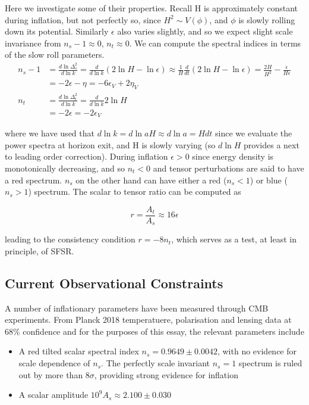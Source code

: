 \documentclass[a4paper,10pt]{article}
\begin{document}
Here we investigate some of their properties. Recall H is approximately constant during inflation, but not perfectly so, since $H^2 \sim V(\phi)$, and $\phi$ is slowly rolling down its potential. Similarly $\epsilon$ also varies slightly, and so we expect slight scale invariance from $n_s-1\approx0$, $n_t\approx0$. We can compute the spectral indices in terms of the slow roll parameters. 
\begin{equation}\begin{split}
n_s-1 &= \frac{d\ln{\Delta^2_s}}{d\ln{k}} = \frac{d}{d\ln{k}}(2\ln{H}-\ln{\epsilon}) \approx \frac{1}{H}\frac{d}{dt}(2\ln{H}-\ln{\epsilon}) = \frac{2\dot{H}}{H^2}-\frac{\dot{\epsilon}}{H\epsilon}\\
& = -2\epsilon-\eta = -6\epsilon_V+2\eta_V\\
n_t &= \frac{d\ln{\Delta^2_t}}{d\ln{k}} = \frac{d}{d\ln{k}}2\ln{H}\\
&=-2\epsilon=-2\epsilon_V
\end{split}\end{equation}

where we have used that $d\ln{k} = d\ln{aH} \approx d\ln{a} = Hdt$ since we evaluate the power spectra at horizon exit, and H is slowly varying (so $d\ln{H}$ provides a next to leading order correction). During inflation $\epsilon>0$ since energy density is monotonically decreasing, and so $n_t<0$ and tensor perturbations are said to have a red spectrum. $n_s$ on the other hand can have either a red ($n_s<1$) or blue ($n_s>1$) spectrum. The scalar to tensor ratio can be computed as

\begin{equation}
r=\frac{A_t}{A_s} \approx 16\epsilon
\end{equation}

leading to the consistency condition $r=-8n_t$, which serves as a test, at least in principle, of SFSR.


\subsection{Current Observational Constraints}


A number of inflationary parameters have been measured through CMB experiments. From Planck 2018 temperatuere, polarisation and lensing data at 68\% confidence and for the purposes of this essay, the relevant parameters include \cite{Planck}
 
\begin{itemize}
\item A red tilted scalar spectral index $n_s =0.9649 \pm 0.0042$, with no evidence for scale dependence of $n_s$. The perfectly scale invariant $n_s=1$ spectrum is ruled out by more than $8\sigma$, providing strong evidence for inflation
\item A scalar amplitude  $10^9 A_s \approx 2.100 \pm 0.030$
\end{itemize}
\end{document}
